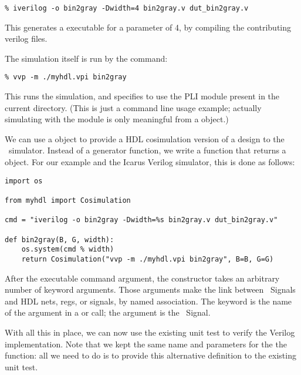 \begin{verbatim}
% iverilog -o bin2gray -Dwidth=4 bin2gray.v dut_bin2gray.v

\end{verbatim}

This generates a  executable for a parameter 
of 4, by compiling the contributing verilog files.

The simulation itself is run by the  command:

\begin{verbatim}
% vvp -m ./myhdl.vpi bin2gray

\end{verbatim}

This runs the  simulation, and specifies to use the
 PLI module present in the current directory. (This is 
just a command line usage example; actually simulating with the
 module is only meaningful from a
 object.)

We can use a  object to provide a HDL cosimulation
version of a design to the \myhdl\ simulator. Instead of a generator
function, we write a function that returns a 
object. For our example and the Icarus Verilog simulator, this is done
as follows:

\begin{verbatim}
import os

from myhdl import Cosimulation

cmd = "iverilog -o bin2gray -Dwidth=%s bin2gray.v dut_bin2gray.v"
      
def bin2gray(B, G, width):
    os.system(cmd % width)
    return Cosimulation("vvp -m ./myhdl.vpi bin2gray", B=B, G=G)

\end{verbatim}

After the executable command argument, the 
constructor takes an arbitrary number of keyword arguments. Those
arguments make the link between \myhdl\ Signals and HDL nets, regs, or
signals, by named association. The keyword is the name of the argument
in a  or  call; the argument is
the \myhdl\ Signal.

With all this in place, we can now use the existing unit test
to verify the Verilog implementation. Note that we kept the
same name and parameters for the the  function:
all we need to do is to provide this alternative definition
to the existing unit test.

